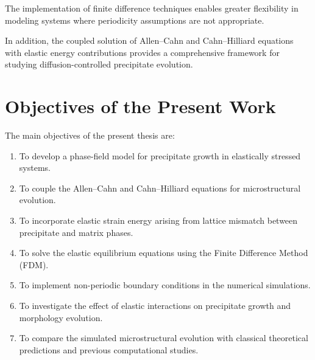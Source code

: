 The implementation of finite difference techniques enables greater flexibility in modeling systems where periodicity assumptions are not appropriate.

In addition, the coupled solution of Allen–Cahn and Cahn–Hilliard equations with elastic energy contributions provides a comprehensive framework for studying diffusion-controlled precipitate evolution.

\section{Objectives of the Present Work}

The main objectives of the present thesis are:
\begin{enumerate}
    \item To develop a phase-field model for precipitate growth in elastically stressed systems.
    \item To couple the Allen–Cahn and Cahn–Hilliard equations for microstructural evolution.
    \item To incorporate elastic strain energy arising from lattice mismatch between precipitate and matrix phases.
    \item To solve the elastic equilibrium equations using the Finite Difference Method (FDM).
    \item To implement non-periodic boundary conditions in the numerical simulations.
    \item To investigate the effect of elastic interactions on precipitate growth and morphology evolution.
    \item To compare the simulated microstructural evolution with classical theoretical predictions and previous computational studies.
\end{enumerate}

